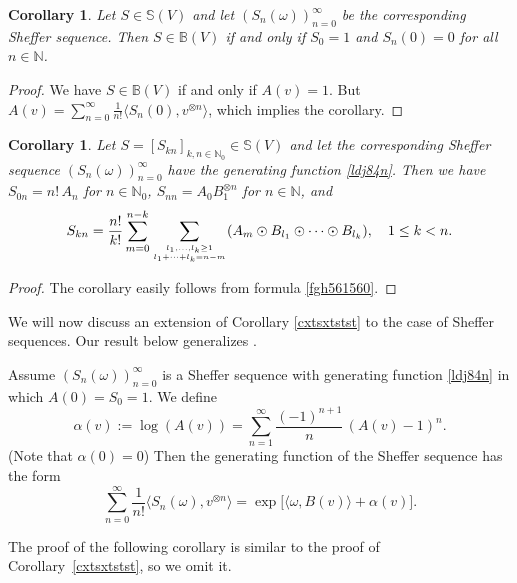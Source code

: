 \documentclass[12pt]{article}
\newtheorem{corollary}[theorem]{Corollary}
\theoremstyle{remark}
\theoremstyle{remark}
\theoremstyle{remark}
\begin{document}
 \begin{corollary} Let $S\in\mathbb S(V)$ and let $(S_n(\omega))_{n=0}^\infty$ be the corresponding Sheffer sequence. Then $S\in\mathbb B(V)$ if and only if $S_0=1$ and $S_n(0)=0$ for all $n\in\mathbb N$.
  \end{corollary}
  
  \begin{proof}  We have $S\in \mathbb B(V)$ if and only if $A(v)=1$. But $A(v)=\sum_{n=0}^\infty \frac1{n!}\langle S_n(0),v^{\otimes n}\rangle$, which implies the corollary.
  \end{proof}

  
  \begin{corollary}\label{dfgh765dcfg} Let $S=[S_{kn}]_{k,n\in\mathbb N_0}\in\mathbb S(V)$ 
  and let the corresponding Sheffer sequence $(S_n(\omega))_{n=0}^\infty$ have the generating function   
  \eqref{ldj84n}. Then we have $S_{0n}=n!\,A_n$ for $n\in\mathbb N_0$, $S_{nn}=A_0B_1^{\otimes n}$ for $n\in\mathbb N$, and 
   \begin{equation*}S_{kn}=\frac{n!}{k!}\sum_{m=0}^{n-k}\sum_{{l_1,\dots,l_k \geq1}\atop l_1+\dots+l_k=n-m}(A_m\odot B_{l_1}\odot \dots \odot B_{l_k}), \quad 1\le k<n.
   \end{equation*}
\end{corollary}

\begin{proof}
The corollary easily follows from formula \eqref{fgh561560}. 
\end{proof}



We will now discuss an extension of Corollary \ref{cxtsxtstst} to the case of Sheffer sequences. Our result below generalizes  \cite[Corollary 7.2]{FKLO}.

Assume $(S_n(\omega))_{n=0}^\infty$ is a Sheffer sequence with generating function \eqref{ldj84n} in which $A(0)=S_0=1$.  We define 
$$\alpha(v):=\log(A(v))=\sum_{n=1}^\infty\frac{(-1)^{n+1}}n\,(A(v)-1)^n.$$
(Note that $\alpha(0)=0$)
Then the generating function of the Sheffer sequence has the form 
\begin{equation}\label{fgh784gh74}\sum_{n=0}^\infty \frac1{n!}\langle S_n(\omega),v^{\otimes n}\rangle=\exp\big[\langle\omega,B(v)\rangle+\alpha(v)].\end{equation}




The proof of the following corollary is similar to the proof of Corollary~\ref{cxtsxtstst}, so we  omit it. 
\end{document}
